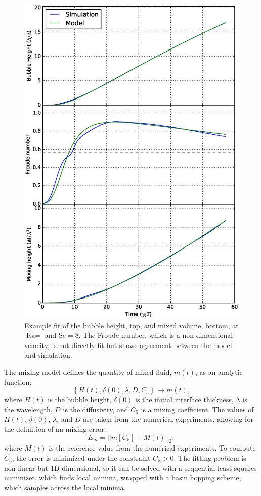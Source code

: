 \begin{figure}
\includegraphics[width=\columnwidth]{figs/H-8-1}
\caption{ 
  Example fit of the bubble height, top, and mixed volume, bottom, at $\text{Ra} = $ and $\text{Sc} = 8$.
  The Froude number, which is a non-dimensional velocity, is not directly fit but shows agreement between the model and simulation.
}
\end{figure}

The mixing model defines the quantity of mixed fluid, $m(t)$, as an analytic function:
\begin{equation}
\left\{H(t), \delta(0), \lambda, D, C_5\right\} \rightarrow m(t),
\end{equation}
where $H(t)$ is the bubble height, 
$\delta(0)$ is the initial interface thickness,
$\lambda$ is the wavelength,
$D$ is the diffusivity, and 
$C_5$ is a mixing coefficient.
The values of $H(t)$, $\delta(0)$, $\lambda$, and $D$ are taken from the numerical experiments, allowing for the definition of an mixing error:
\begin{equation}
E_m = \left|\left|m\left[C_5\right] - M(t) \right| \right|_2,
\end{equation}
where $M(t)$ is the reference value from the numerical experiments.
To compute $C_5$, the error is minimized under the constraint $C_5 > 0$.
The fitting problem is non-linear but 1D dimensional, so it can be solved with a sequential least squares minimizer, which finds local minima, wrapped with a basin hopping scheme, which samples across the local minima.

